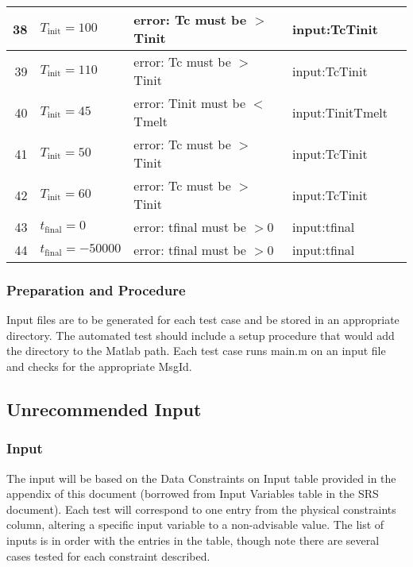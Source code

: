 \documentclass[12pt]{article}
\begin{document}
\begin{center}
\begin{longtable}{ | r | p{4cm} | p{4cm} | p{4cm} | p{4cm} |}
	38 & $T_{\text{init}} = 100$ & error: Tc must be $>$ Tinit & input:TcTinit \\ \hline
	39 & $T_{\text{init}} = 110$ & error: Tc must be $>$ Tinit & input:TcTinit \\ \hline
	40 & $T_{\text{init}} = 45$ &error: Tinit must be $<$ Tmelt & input:TinitTmelt \\ \hline
	41 & $T_{\text{init}} = 50$ &error: Tc must be $>$ Tinit & input:TcTinit \\ \hline
	42 & $T_{\text{init}} = 60$ &error: Tc must be $>$ Tinit & input:TcTinit \\ \hline
	43 & $t_{\text{final}} = 0$ &error: tfinal must be $> 0$ &input:tfinal \\ \hline
	44 & $t_{\text{final}} = -50000$ &error: tfinal must be $> 0$ &input:tfinal \\ \hline
	\end{longtable}
\end{center}

\subsubsection{Preparation and Procedure}
Input files are to be generated for each test case and be stored in an appropriate
 directory. The automated test should include a setup procedure that would add 
 the directory to the Matlab path. Each test case runs main.m on an input file
  and checks for the appropriate MsgId. 

\subsection{Unrecommended Input}

\subsubsection{Input}
The input will be based on the Data Constraints on Input table provided 
in the appendix of this document (borrowed from Input Variables table in the SRS document). Each test will correspond to one entry from 
the physical constraints column, altering a specific input variable to a non-advisable
 value. The list of inputs is in order with the entries in the table, though note there are several cases tested for each constraint described.
 
\end{document}
